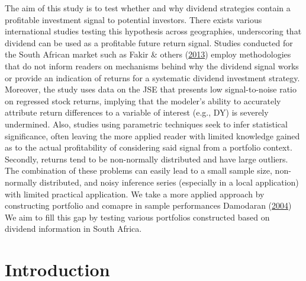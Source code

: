 \documentclass[10pt,preprint, authoryear]{elsarticle}
\numberwithin{equation}{section}
\numberwithin{figure}{section}
\numberwithin{table}{section}
\begin{document}
The aim of this study is to test whether and why dividend strategies
contain a profitable investment signal to potential investors. There
exists various international studies testing this hypothesis across
geographies, underscoring that dividend can be used as a profitable
future return signal. Studies conducted for the South African market
such as Fakir \& others
(\protect\hyperlink{ref-fakir2013dividend}{2013}) employ methodologies
that do not inform readers on mechanisms behind why the dividend signal
works or provide an indication of returns for a systematic dividend
investment strategy. Moreover, the study uses data on the JSE that
presents low signal-to-noise ratio on regressed stock returns, implying
that the modeler's ability to accurately attribute return differences to
a variable of interest (e.g., DY) is severely undermined. Also, studies
using parametric techniques seek to infer statistical significance,
often leaving the more applied reader with limited knowledge gained as
to the actual profitability of considering said signal from a portfolio
context. Secondly, returns tend to be non-normally distributed and have
large outliers. The combination of these problems can easily lead to a
small sample size, non-normally distributed, and noisy inference series
(especially in a local application) with limited practical application.
We take a more applied approach by constructing portfolio and comapre in
sample performances Damodaran
(\protect\hyperlink{ref-damodaran2004investment}{2004}) We aim to fill
this gap by testing various portfolios constructed based on dividend
information in South Africa.

\newpage

\hypertarget{introduction}{%
\section*{Introduction}\label{introduction}}
\end{document}
